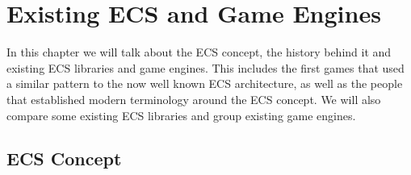 \chapter{Existing ECS and Game Engines}\label{chap:existing}

In this chapter we will talk about the ECS concept, the history behind it and existing ECS libraries and game engines. This includes the first games that used a similar pattern to the now well known ECS architecture, as well as the people that established modern terminology around the ECS concept. We will also compare some existing ECS libraries and group existing game engines.

\section{ECS Concept}

